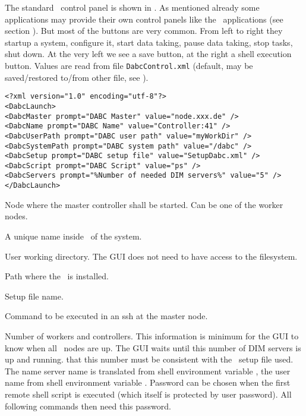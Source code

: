 The standard \dabc\ control panel is shown in .
As mentioned already some applications may provide their own control panels
like the \mbs\ applications (see section ).
But most of the buttons are very common.
From left to right they startup a system, configure it, start
data taking, pause data taking, stop tasks, shut down.
At the very left we see a save button, at the right a shell execution button.
Values are read from file {\tt DabcControl.xml} (default, may be saved/restored to/from other file,
see ).
{\small \begin{verbatim}
<?xml version="1.0" encoding="utf-8"?>
<DabcLaunch>
<DabcMaster prompt="DABC Master" value="node.xxx.de" />
<DabcName prompt="DABC Name" value="Controller:41" />
<DabcUserPath prompt="DABC user path" value="myWorkDir" />
<DabcSystemPath prompt="DABC system path" value="/dabc" />
<DabcSetup prompt="DABC setup file" value="SetupDabc.xml" />
<DabcScript prompt="DABC Script" value="ps" />
<DabcServers prompt="%Number of needed DIM servers%" value="5" />
</DabcLaunch>
\end{verbatim}
}
\bdes
\item[DabcMaster:] Node where the master controller shall be started.
Can be one of the worker nodes.
\item[DabcName:] A unique name inside \dabc\ of the system.
\item[DabcUserPath:] User working directory. The GUI does not need to have
access to the filesystem. 
\item[DabcSystemPath:] Path where the \dabc\ is installed.
\item[DabcSetup:] Setup file name.
\item[DabcScript:] Command to be executed in an ssh at the master node.
\item[DabcServers:] Number of workers and controllers. This information
is minimum for the GUI to know when all \dabc\ nodes are up. The GUI waits until
this number of DIM servers is up and running.  that this number 
must be consistent with the \dabc\ setup file used.
\edes
The name server name is translated from shell environment variable ,
the user name from shell environment variable . Password can be chosen when
the first remote shell script is executed (which itself is protected by
user password). All following commands then need this password.

